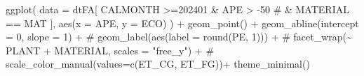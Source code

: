 \documentclass[
  american,
  10,
  a4paper,
]{book}
\newenvironment{Shaded}{\begin{snugshade}}{\end{snugshade}}
\newcommand{\AttributeTok}[1]{\textcolor[rgb]{0.40,0.45,0.13}{#1}}
\newcommand{\CommentTok}[1]{\textcolor[rgb]{0.37,0.37,0.37}{#1}}
\newcommand{\DecValTok}[1]{\textcolor[rgb]{0.68,0.00,0.00}{#1}}
\newcommand{\FunctionTok}[1]{\textcolor[rgb]{0.28,0.35,0.67}{#1}}
\newcommand{\NormalTok}[1]{\textcolor[rgb]{0.00,0.23,0.31}{#1}}
\newcommand{\SpecialCharTok}[1]{\textcolor[rgb]{0.37,0.37,0.37}{#1}}
\newcommand{\StringTok}[1]{\textcolor[rgb]{0.13,0.47,0.30}{#1}}
\theoremstyle{definition}
\theoremstyle{remark}
\begin{document}
\begin{Shaded}
\begin{Highlighting}[]
\FunctionTok{ggplot}\NormalTok{(}
  \AttributeTok{data =}\NormalTok{ dtFA[}
\NormalTok{    CALMONTH }\SpecialCharTok{\textgreater{}=}\StringTok{\textquotesingle{}202401\textquotesingle{}} 
    \SpecialCharTok{\&}\NormalTok{ APE }\SpecialCharTok{\textgreater{}} \SpecialCharTok{{-}}\DecValTok{50}
    \CommentTok{\# \& MATERIAL == MAT}
\NormalTok{  ], }
  \FunctionTok{aes}\NormalTok{(}\AttributeTok{x =}\NormalTok{ APE, }\AttributeTok{y =}\NormalTok{ ECO)}
\NormalTok{) }\SpecialCharTok{+}
  \FunctionTok{geom\_point}\NormalTok{() }\SpecialCharTok{+}
  \FunctionTok{geom\_abline}\NormalTok{(}\AttributeTok{intercept =} \DecValTok{0}\NormalTok{, }\AttributeTok{slope =} \DecValTok{1}\NormalTok{) }\SpecialCharTok{+}
  \CommentTok{\# geom\_label(aes(label = round(PE, 1))) +}
  \CommentTok{\# facet\_wrap(\textasciitilde{} PLANT + MATERIAL, scales = "free\_y") +}
  \CommentTok{\# scale\_color\_manual(values=c(ET\_CG, ET\_FG))+}
  \FunctionTok{theme\_minimal}\NormalTok{()}
\end{Highlighting}
\end{Shaded}
\end{document}
